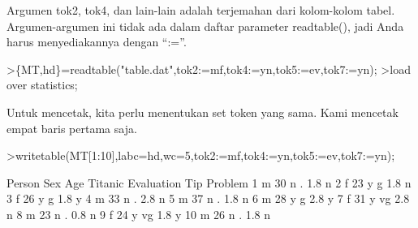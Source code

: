 \documentclass[a4paper,10pt]{article}
\begin{document}
\begin{eulernotebook}
\begin{eulercomment}
\begin{eulercomment}
\begin{eulercomment}
\begin{eulercomment}
\begin{eulercomment}
\begin{eulercomment}
\begin{eulercomment}
\begin{eulercomment}
\begin{eulercomment}
\begin{eulercomment}
\begin{eulercomment}
\begin{eulercomment}
\begin{eulercomment}
\begin{eulercomment}
\begin{eulercomment}
\begin{eulercomment}
\begin{eulercomment}
\begin{eulercomment}
\begin{eulercomment}
\begin{eulercomment}
\begin{eulercomment}
\begin{eulercomment}
\begin{eulercomment}
\begin{eulercomment}
\begin{eulercomment}
\begin{eulercomment}
\begin{eulercomment}
\begin{eulercomment}
\begin{eulercomment}
\begin{eulercomment}
\begin{eulercomment}
\begin{eulercomment}
\begin{eulercomment}
\begin{eulercomment}
\begin{eulercomment}
\begin{eulercomment}
\begin{eulercomment}
\begin{eulercomment}
\begin{eulercomment}
\begin{eulercomment}
\begin{eulercomment}
\begin{eulercomment}
\begin{eulercomment}
\begin{eulercomment}
\begin{eulercomment}
Argumen tok2, tok4, dan lain-lain adalah terjemahan dari kolom-kolom
tabel. Argumen-argumen ini tidak ada dalam daftar parameter
readtable(), jadi Anda harus menyediakannya dengan “:=”.
\end{eulercomment}
\begin{eulerprompt}
>\{MT,hd\}=readtable("table.dat",tok2:=mf,tok4:=yn,tok5:=ev,tok7:=yn);
>load over statistics;
\end{eulerprompt}
\begin{eulercomment}
Untuk mencetak, kita perlu menentukan set token yang sama. Kami
mencetak empat baris pertama saja.
\end{eulercomment}
\begin{eulerprompt}
>writetable(MT[1:10],labc=hd,wc=5,tok2:=mf,tok4:=yn,tok5:=ev,tok7:=yn);
\end{eulerprompt}
\begin{euleroutput}
   Person  Sex  Age Titanic Evaluation  Tip Problem
        1    m   30       n          .  1.8       n
        2    f   23       y          g  1.8       n
        3    f   26       y          g  1.8       y
        4    m   33       n          .  2.8       n
        5    m   37       n          .  1.8       n
        6    m   28       y          g  2.8       y
        7    f   31       y         vg  2.8       n
        8    m   23       n          .  0.8       n
        9    f   24       y         vg  1.8       y
       10    m   26       n          .  1.8       n
\end{euleroutput}

\end{eulercomment}
\end{eulercomment}
\end{eulercomment}
\end{eulercomment}
\end{eulercomment}
\end{eulercomment}
\end{eulercomment}
\end{eulercomment}
\end{eulercomment}
\end{eulercomment}
\end{eulercomment}
\end{eulercomment}
\end{eulercomment}
\end{eulercomment}
\end{eulercomment}
\end{eulercomment}
\end{eulercomment}
\end{eulercomment}
\end{eulercomment}
\end{eulercomment}
\end{eulercomment}
\end{eulercomment}
\end{eulercomment}
\end{eulercomment}
\end{eulercomment}
\end{eulercomment}
\end{eulercomment}
\end{eulercomment}
\end{eulercomment}
\end{eulercomment}
\end{eulercomment}
\end{eulercomment}
\end{eulercomment}
\end{eulercomment}
\end{eulercomment}
\end{eulercomment}
\end{eulercomment}
\end{eulercomment}
\end{eulercomment}
\end{eulercomment}
\end{eulercomment}
\end{eulercomment}
\end{eulercomment}
\end{eulercomment}
\end{eulernotebook}
\end{document}
